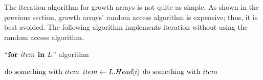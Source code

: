 \HdrGrowthArrayImpl

The iteration algorithm for growth arrays is not quite as simple. As shown in the previous section, growth arrays' random access algorithm is expensive; thus, it is best avoided. The following algorithm implements iteration without using the random access algorithm.

\begin{algorithm}[H]
	\caption{``$\textbf{for } item \textbf{ in } L$'' algorithm \TextGrowthArray}
	\begin{algorithmic}
			\For{$\LclItem \TextIn \LclBuffer$}
				\State $\text{do something with } item$
			\EndFor
		\EndFor
			\State $item \gets L.Head[i]$
			\State $\text{do something with } item$
		\EndFor
	\end{algorithmic}
\end{algorithm}